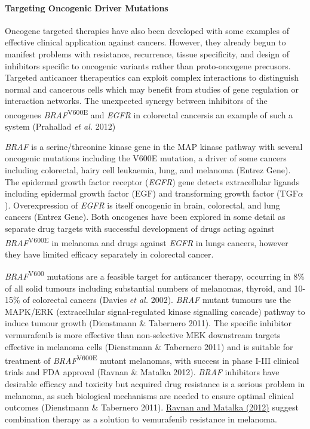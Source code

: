 \paragraph{Targeting Oncogenic Driver Mutations}
Oncogene targeted therapies have also been developed with some examples of effective clinical application against cancers. However, they already begun to manifest problems with resistance, recurrence, tissue specificity, and design of inhibitors specific to oncogenic variants rather than proto-oncogene precusors. Targeted anticancer therapeutics can exploit complex interactions to distinguish normal and cancerous cells which may benefit from studies of gene regulation or interaction networks. The unexpected synergy between inhibitors of the oncogenes \textit{BRAF}\textsuperscript{V600E} and \textit{EGFR} in colorectal cancersis an example of such a system (Prahallad\textit{ et al.} 2012)

\textit{BRAF} is a serine/threonine kinase gene in the MAP kinase pathway with several oncogenic mutations including the V600E mutation, a driver of some cancers including colorectal, hairy cell leukaemia, lung, and melanoma (Entrez Gene). The epidermal growth factor receptor (\textit{EGFR}) gene detects extracellular ligands including epidermal growth factor (EGF) and  transforming growth factor (TGF$\alpha$). Overexpression of \textit{EGFR} is itself oncogenic in brain, colorectal, and lung cancers (Entrez Gene). Both oncogenes have been explored in some detail as separate drug targets with successful development of drugs acting against \textit{BRAF}\textsuperscript{V600E} in melanoma and drugs against \textit{EGFR} in lungs cancers, however they have limited efficacy separately in colorectal cancer.  

\textit{BRAF}\textsuperscript{V600} mutations are a feasible target for anticancer therapy, occurring in 8\% of all solid tumours including substantial numbers of melanomas, thyroid, and 10-15\% of colorectal cancers (Davies\textit{ et al.} 2002). \textit{BRAF} mutant tumours use the MAPK/ERK (extracellular signal-regulated kinase signalling cascade) pathway to induce tumour growth (Dienstmann \& Tabernero 2011). The specific inhibitor vermurafenib is more effective than non-selective MEK downstream targets effective in melanoma cells (Dienstmann \& Tabernero 2011) and is suitable for treatment of \textit{BRAF}\textsuperscript{V600E} mutant melanomas, with success in phase I-III clinical trials and FDA approval (Ravnan \& Matalka 2012). \textit{BRAF} inhibitors have desirable efficacy and toxicity but acquired drug resistance is a serious problem in melanoma, as such biological mechanisms are needed to ensure optimal clinical outcomes (Dienstmann \& Tabernero 2011). \hyperlink{ENREF82}{Ravnan and Matalka (2012)} suggest combination therapy as a solution to vemurafenib resistance in melanoma.  

